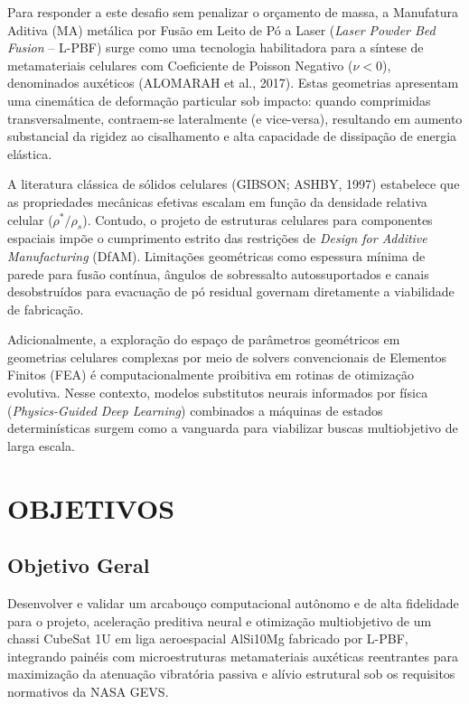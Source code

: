 \documentclass[12pt,a4paper]{report}
\begin{document}
Para responder a este desafio sem penalizar o orçamento de massa, a Manufatura Aditiva (MA) metálica por Fusão em Leito de Pó a Laser (\textit{Laser Powder Bed Fusion} -- L-PBF) surge como uma tecnologia habilitadora para a síntese de metamateriais celulares com Coeficiente de Poisson Negativo ($\nu < 0$), denominados auxéticos (ALOMARAH et al., 2017). Estas geometrias apresentam uma cinemática de deformação particular sob impacto: quando comprimidas transversalmente, contraem-se lateralmente (e vice-versa), resultando em aumento substancial da rigidez ao cisalhamento e alta capacidade de dissipação de energia elástica.

A literatura clássica de sólidos celulares (GIBSON; ASHBY, 1997) estabelece que as propriedades mecânicas efetivas escalam em função da densidade relativa celular ($\rho^* / \rho_s$). Contudo, o projeto de estruturas celulares para componentes espaciais impõe o cumprimento estrito das restrições de \textit{Design for Additive Manufacturing} (DfAM). Limitações geométricas como espessura mínima de parede para fusão contínua, ângulos de sobressalto autossuportados e canais desobstruídos para evacuação de pó residual governam diretamente a viabilidade de fabricação.

Adicionalmente, a exploração do espaço de parâmetros geométricos em geometrias celulares complexas por meio de solvers convencionais de Elementos Finitos (FEA) é computacionalmente proibitiva em rotinas de otimização evolutiva. Nesse contexto, modelos substitutos neurais informados por física (\textit{Physics-Guided Deep Learning}) combinados a máquinas de estados determinísticas surgem como a vanguarda para viabilizar buscas multiobjetivo de larga escala.

\chapter{OBJETIVOS}

\section{Objetivo Geral}
Desenvolver e validar um arcabouço computacional autônomo e de alta fidelidade para o projeto, aceleração preditiva neural e otimização multiobjetivo de um chassi CubeSat 1U em liga aeroespacial AlSi10Mg fabricado por L-PBF, integrando painéis com microestruturas metamateriais auxéticas reentrantes para maximização da atenuação vibratória passiva e alívio estrutural sob os requisitos normativos da NASA GEVS.
\end{document}
